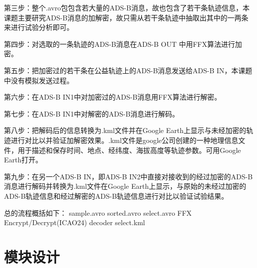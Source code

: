 第三步：整个.avro包包含若大量的ADS-B消息，故也包含了若干条轨迹信息，本课题主要研究ADS-B消息的加解密，故只需从若干条轨迹中抽取出其中的一两条来进行试验分析即可。

第四步：对选取的一条轨迹的ADS-B消息在ADS-B OUT 中用FFX算法进行加密。

第五步：把加密过的若干条在公益轨迹上的ADS-B消息发送给ADS-B IN，本课题中没有模拟发送过程。

第六步：在ADS-B IN1中对加密过的ADS-B消息用FFX算法进行解密。

第七步：在ADS-B IN1中对解密的ADS-B消息进行解码。

第八步：把解码后的信息转换为.kml文件并在Google Earth上显示与未经加密的轨迹进行对比以并验证加解密效果。.kml文件是google公司创建的一种地理信息文件，用于描述和保存时间、地点、经纬度、海拔高度等轨迹参数。可用Google Earth打开。

第九步：在另一个ADS-B IN，即ADS-B IN2中直接对接收到的经过加密的ADS-B消息进行解码并转换为.kml文件在Google Earth上显示，与原始的未经过加密的ADS-B轨迹信息和经过解密的ADS-B轨迹信息进行对比以验证试验结果。

总的流程概括如下：\newline
sample.avro \to sorted.avro \to select.avro \to FFX Encrypt/Decrypt(ICAO24) \to decoder \to select.kml

\section{模块设计}
